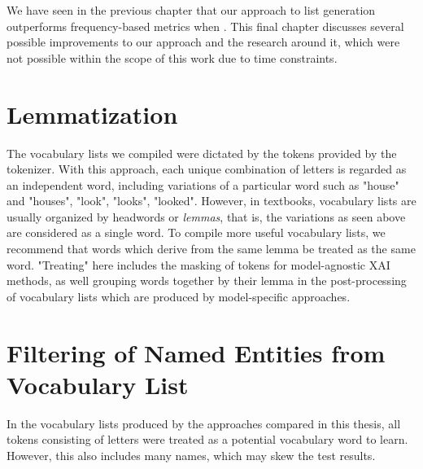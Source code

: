 %
We have seen in the previous chapter that our approach to list generation outperforms frequency-based metrics when .
This final chapter discusses several possible improvements to our approach and the research around it, which were not possible within the scope of this work due to time constraints.

\section{Lemmatization}
The vocabulary lists we compiled were dictated by the tokens provided by the tokenizer.
With this approach, each unique combination of letters is regarded as an independent word, including variations of a particular word such as "house" and "houses", "look", "looks", "looked".
However, in textbooks, vocabulary lists are usually organized by headwords or \textit{lemmas}, that is, the variations as seen above are considered as a single word.
To compile more useful vocabulary lists, we recommend that words which derive from the same lemma be treated as the same word.
"Treating" here includes the masking of tokens for model-agnostic XAI methods, as well grouping words together by their lemma in the post-processing of vocabulary lists which are produced by model-specific approaches.


\section{Filtering of Named Entities from Vocabulary List}
In the vocabulary lists produced by the approaches compared in this thesis, all tokens consisting of letters were treated as a potential vocabulary word to learn.
However, this also includes many names, which may skew the test results.


